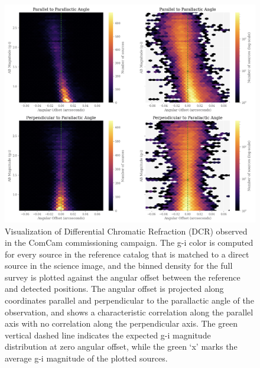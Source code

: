 \begin{figure}
  \centering
  \includegraphics{dcr_figures/dcr_plot1.png}
  \caption{Visualization of Differential Chromatic Refraction (DCR) observed in the ComCam commissioning campaign. The g-i color is computed for every source in the reference catalog that is matched to a direct source in the science image, and the binned density for the full survey is plotted against the angular offset between the reference and detected positions. The angular offset is projected along coordinates parallel and perpendicular to the parallactic angle of the observation, and shows a characteristic correlation along the parallel axis with no correlation along the perpendicular axis. The green vertical dashed line indicates the expected g-i magnitude distribution at zero angular offset, while the green ‘x’ marks the average g-i magnitude of the plotted sources.}
  \label{fig:dcr}
\end{figure}

